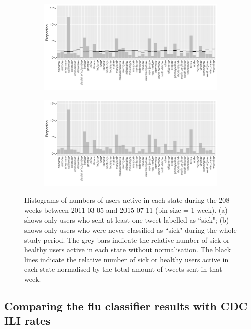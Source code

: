 \documentclass[11pt, a4paper,twoside]{report}\usepackage[]{graphicx}\usepackage[]{color}
\begin{document}
\begin{figure}[htbp!]
\centering
  \begin{subfigure}[t]{1\textwidth}
  \includegraphics[width=1\linewidth]{22_activity_sick_user_statename_Twitter_full_aggregatedoverlay.pdf}
  \caption{}
  \end{subfigure}
\hfill
  \begin{subfigure}[t]{1\textwidth}
  \includegraphics[width=1\linewidth]{23_activity_healthy_user_statename_Twitter_full_aggregatedoverlay.pdf}
  \caption{}
  \end{subfigure}
  \caption{Histograms of numbers of users active in each state during the 208 weeks between 2011-03-05 and 2015-07-11 (bin size = 1 week). (a) shows only users who sent at least one tweet labelled as ``sick"; (b) shows only users who were never classified as ``sick" during the whole study period. The grey bars indicate the relative number of sick or healthy users active in each state without normalisation. The black lines indicate the relative number of sick or healthy users active in each state normalised by the total amount of tweets sent in that week.}
  \label{fig:tweets_state_healthy_sick_user}
\end{figure}

\subsection{Comparing the flu classifier results with CDC ILI rates}
\label{sec:comp_cdc}
\end{document}
